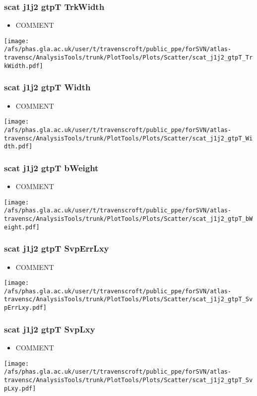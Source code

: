 \documentclass{beamer}
\begin{document}
\begin{frame}
\frametitle{scat j1j2 gtpT TrkWidth}
\begin{itemize}
\item COMMENT
\end{itemize}
\begin{center}
\texttt{[image: /afs/phas.gla.ac.uk/user/t/travenscroft/public\_ppe/forSVN/atlas-travensc/AnalysisTools/trunk/PlotTools/Plots/Scatter/scat\_j1j2\_gtpT\_TrkWidth.pdf]}
\end{center}
\end{frame}

\begin{frame}
\frametitle{scat j1j2 gtpT Width}
\begin{itemize}
\item COMMENT
\end{itemize}
\begin{center}
\texttt{[image: /afs/phas.gla.ac.uk/user/t/travenscroft/public\_ppe/forSVN/atlas-travensc/AnalysisTools/trunk/PlotTools/Plots/Scatter/scat\_j1j2\_gtpT\_Width.pdf]}
\end{center}
\end{frame}

\begin{frame}
\frametitle{scat j1j2 gtpT bWeight}
\begin{itemize}
\item COMMENT
\end{itemize}
\begin{center}
\texttt{[image: /afs/phas.gla.ac.uk/user/t/travenscroft/public\_ppe/forSVN/atlas-travensc/AnalysisTools/trunk/PlotTools/Plots/Scatter/scat\_j1j2\_gtpT\_bWeight.pdf]}
\end{center}
\end{frame}

\begin{frame}
\frametitle{scat j1j2 gtpT SvpErrLxy}
\begin{itemize}
\item COMMENT
\end{itemize}
\begin{center}
\texttt{[image: /afs/phas.gla.ac.uk/user/t/travenscroft/public\_ppe/forSVN/atlas-travensc/AnalysisTools/trunk/PlotTools/Plots/Scatter/scat\_j1j2\_gtpT\_SvpErrLxy.pdf]}
\end{center}
\end{frame}

\begin{frame}
\frametitle{scat j1j2 gtpT SvpLxy}
\begin{itemize}
\item COMMENT
\end{itemize}
\begin{center}
\texttt{[image: /afs/phas.gla.ac.uk/user/t/travenscroft/public\_ppe/forSVN/atlas-travensc/AnalysisTools/trunk/PlotTools/Plots/Scatter/scat\_j1j2\_gtpT\_SvpLxy.pdf]}
\end{center}
\end{frame}
\end{document}
